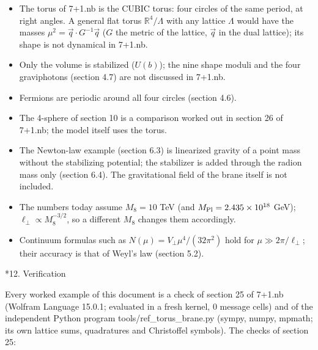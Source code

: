 \documentclass[10pt,a4paper]{article}
\makeatletter
\renewcommand\section{\@startsection{section}{1}{\z@}{-3.5ex \@plus -1ex \@minus -.2ex}{2.3ex \@plus.2ex}{\normalfont\Large\bfseries\raggedright}}
\makeatother
\begin{document}
\begin{itemize}
\item The torus of 7+1.nb is the CUBIC torus: four circles of the same period, at right angles. A general flat torus $\mathbb R^4/\Lambda$ with any lattice $\Lambda$ would have the masses $\mu^2=\vec q\cdot G^{-1}\vec q$ ($G$ the metric of the lattice, $\vec q$ in the dual lattice); its shape is not dynamical in 7+1.nb.
\item Only the volume is stabilized ($U(b)$); the nine shape moduli and the four graviphotons (section 4.7) are not discussed in 7+1.nb.
\item Fermions are periodic around all four circles (section 4.6).
\item The 4-sphere of section 10 is a comparison worked out in section 26 of 7+1.nb; the model itself uses the torus.
\item The Newton-law example (section 6.3) is linearized gravity of a point mass without the stabilizing potential; the stabilizer is added through the radion mass only (section 6.4). The gravitational field of the brane itself is not included.
\item The numbers today assume $M_8=10$ TeV (and $M_{\rm Pl}=2.435\times10^{18}$ GeV); $\ell_\perp\propto M_8^{-3/2}$, so a different $M_8$ changes them accordingly.
\item Continuum formulas such as $N(\mu)=V_\perp\mu^4/(32\pi^2)$ hold for $\mu\gg2\pi/\ell_\perp$; their accuracy is that of Weyl’s law (section 5.2).
\end{itemize}
\section*{12. Verification}
Every worked example of this document is a check of section 25 of 7+1.nb (Wolfram Language 15.0.1; evaluated in a fresh kernel, 0 message cells) and of the independent Python program tools/ref\_torus\_brane.py (sympy, numpy, mpmath; its own lattice sums, quadratures and Christoffel symbols). The checks of section 25:
\end{document}
